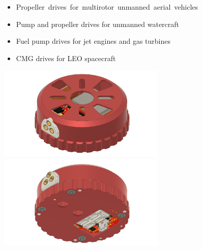 \documentclass{../document_templates/documentation_template_latex/zubaxdoc}
\begin{document}
\begin{titlepage}
\begin{itemize}
    \item \mbox{Propeller drives for multirotor unmanned aerial vehicles}
    \item Pump and propeller drives for unmanned watercraft
    \item Fuel pump drives for jet engines and gas turbines
    \item CMG drives for LEO spacecraft 
\end{itemize}

\centering
\includegraphics[width=0.6\textwidth]{top_view.png}
\includegraphics[width=0.6\textwidth]{bottom_view.png}
\end{titlepage}

\tableofcontents
\BeginRightColumn
\listoffigures
\listoftables

\mainmatter







\end{document}
